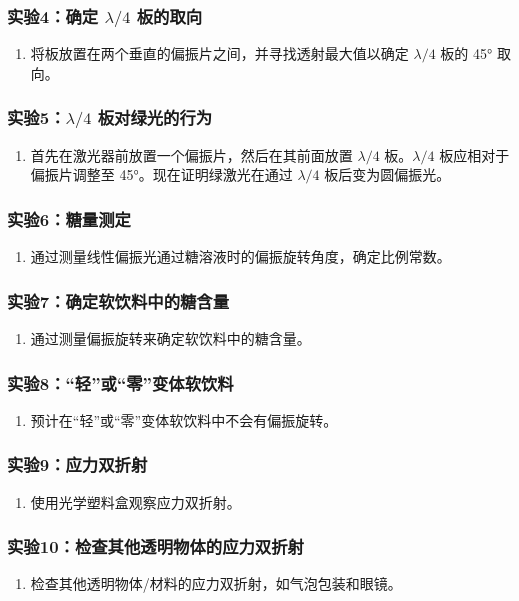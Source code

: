 \documentclass{ctexart}
\begin{document}
\subsubsection{实验4：确定 $\lambda/4$ 板的取向}
\begin{enumerate}
    \item 将板放置在两个垂直的偏振片之间，并寻找透射最大值以确定 $\lambda/4$ 板的 45° 取向。
\end{enumerate}

\subsubsection{实验5：$\lambda/4$ 板对绿光的行为}
\begin{enumerate}
    \item 首先在激光器前放置一个偏振片，然后在其前面放置 $\lambda/4$ 板。$\lambda/4$ 板应相对于偏振片调整至 45°。现在证明绿激光在通过 $\lambda/4$ 板后变为圆偏振光。
\end{enumerate}

\subsubsection{实验6：糖量测定}
\begin{enumerate}
    \item 通过测量线性偏振光通过糖溶液时的偏振旋转角度，确定比例常数。
\end{enumerate}

\subsubsection{实验7：确定软饮料中的糖含量}
\begin{enumerate}
    \item 通过测量偏振旋转来确定软饮料中的糖含量。
\end{enumerate}

\subsubsection{实验8：“轻”或“零”变体软饮料}
\begin{enumerate}
    \item 预计在“轻”或“零”变体软饮料中不会有偏振旋转。
\end{enumerate}

\subsubsection{实验9：应力双折射}
\begin{enumerate}
    \item 使用光学塑料盒观察应力双折射。
\end{enumerate}

\subsubsection{实验10：检查其他透明物体的应力双折射}
\begin{enumerate}
    \item 检查其他透明物体/材料的应力双折射，如气泡包装和眼镜。
\end{enumerate}
\end{document}
